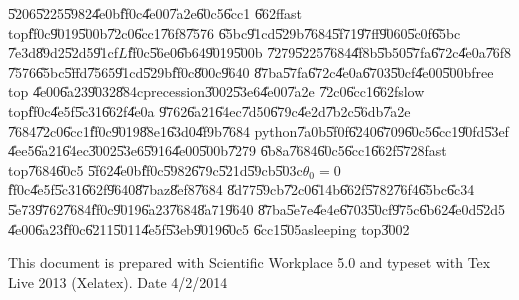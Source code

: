 \documentclass[12pt]{article}
\begin{document}
\U{5206}\U{5225}\U{5982}\U{4e0b}\U{ff0c}\U{4e00}\U{7a2e}\U{60c5}\U{6cc1}%
\U{662f}fast top\U{ff0c}\U{9019}\U{500b}\U{72c0}\U{6cc1}\U{76f8}\U{7576}%
\U{65bc}\U{91cd}\U{529b}\U{7684}\U{5f71}\U{97ff}\U{9060}\U{5c0f}\U{65bc}%
\U{7e3d}\U{89d2}\U{52d5}\U{91cf}$L$\U{ff0c}\U{56e0}\U{6b64}\U{9019}\U{500b}%
\U{7279}\U{5225}\U{7684}\U{4f8b}\U{5b50}\U{57fa}\U{672c}\U{4e0a}\U{76f8}%
\U{7576}\U{65bc}\U{5ffd}\U{7565}\U{91cd}\U{529b}\U{ff0c}\U{800c}\U{9640}%
\U{87ba}\U{57fa}\U{672c}\U{4e0a}\U{6703}\U{50cf}\U{4e00}\U{500b}free top%
\U{4e00}\U{6a23}\U{9032}\U{884c}precession\U{3002}\U{53e6}\U{4e00}\U{7a2e}%
\U{72c0}\U{6cc1}\U{662f}slow top\U{ff0c}\U{4e5f}\U{5c31}\U{662f}\U{4e0a}%
\U{9762}\U{6a21}\U{64ec}\U{7d50}\U{679c}\U{4e2d}\U{7b2c}\U{56db}\U{7a2e}%
\U{7684}\U{72c0}\U{6cc1}\U{ff0c}\U{9019}\U{88e1}\U{63d0}\U{4f9b}\U{7684}%
python\U{7a0b}\U{5f0f}\U{6240}\U{6709}\U{60c5}\U{6cc1}\U{90fd}\U{53ef}%
\U{4ee5}\U{6a21}\U{64ec}\U{3002}\U{53e6}\U{5916}\U{4e00}\U{500b}\U{7279}%
\U{6b8a}\U{7684}\U{60c5}\U{6cc1}\U{662f}\U{5728}fast top\U{7684}\U{60c5}%
\U{5f62}\U{4e0b}\U{ff0c}\U{5982}\U{679c}\U{521d}\U{59cb}\U{503c}$\theta
_{0}=0$\U{ff0c}\U{4e5f}\U{5c31}\U{662f}\U{9640}\U{87ba}z\U{8ef8}\U{7684}%
\U{8d77}\U{59cb}\U{72c0}\U{614b}\U{662f}\U{5782}\U{76f4}\U{65bc}\U{6c34}%
\U{5e73}\U{9762}\U{7684}\U{ff0c}\U{9019}\U{6a23}\U{7684}\U{8a71}\U{9640}%
\U{87ba}\U{5e7e}\U{4e4e}\U{6703}\U{50cf}\U{975c}\U{6b62}\U{4e0d}\U{52d5}%
\U{4e00}\U{6a23}\U{ff0c}\U{6211}\U{5011}\U{4e5f}\U{53eb}\U{9019}\U{60c5}%
\U{6cc1}\U{505a}sleeping top\U{3002}

\href{https://drive.google.com/file/d/0B96HmLH-SQVmekx0a0RoSVFzWFE/edit?usp=sharing%
}{\underline{\color{blue}}}

\href{http://tinypic.com/r/10cw9yf/8}{\underline{\color{blue}}}

This document is prepared with Scientific Workplace 5.0 and typeset with Tex
Live 2013 (Xelatex). Date 4/2/2014
\end{document}
